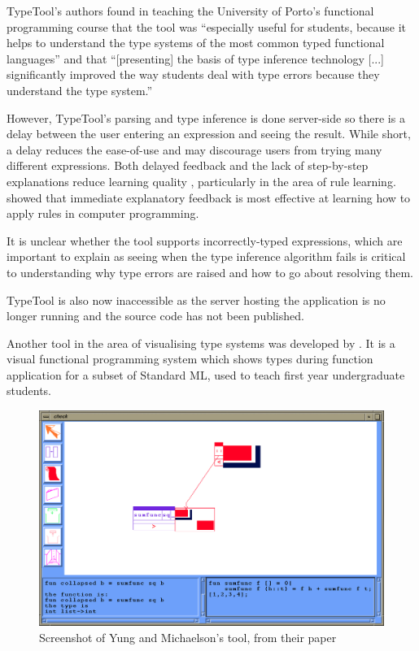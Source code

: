 \documentclass[a4paper,fleqn,oneside,12pt]{report}
\begin{document}
TypeTool's authors found in teaching the University of Porto's functional programming course that the tool was ``especially useful for students, because it helps to understand the type systems of the most common typed functional languages'' and that ``[presenting] the basis of type inference technology [...] significantly improved the way students deal with type errors because they understand the type system.''

However, TypeTool's parsing and type inference is done server-side so there is a delay between the user entering an expression and seeing the result. While short, a delay reduces the ease-of-use and may discourage users from trying many different expressions. Both delayed feedback and the lack of step-by-step explanations reduce learning quality \citep{ref5}, particularly in the area of rule learning. \cite{ref6} showed that immediate explanatory feedback is most effective at learning how to apply rules in computer programming.

It is unclear whether the tool supports incorrectly-typed expressions, which are important to explain as seeing when the type inference algorithm fails is critical to understanding why type errors are raised and how to go about resolving them.

TypeTool is also now inaccessible as the server hosting the application is no longer running and the source code has not been published.

Another tool in the area of visualising type systems was developed by \cite{ref7}. It is a visual functional programming system which shows types during function application for a subset of Standard ML, used to teach first year undergraduate students.

{\centering \begin{figure}[h!]
  \centering
  \includegraphics[width=0.75\linewidth]{images/image6.png}
  \caption{Screenshot of Yung and Michaelson's tool, from their paper}
\end{figure} \par}
\end{document}
